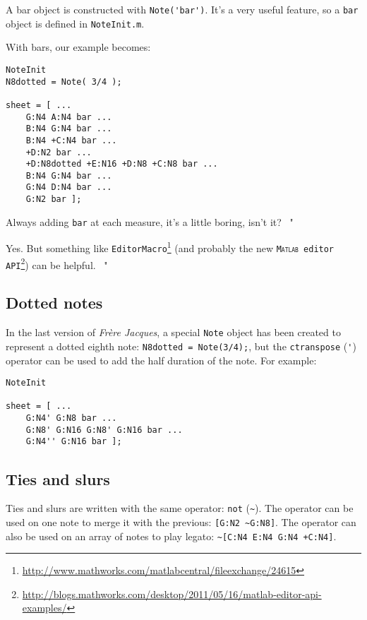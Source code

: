 \documentclass{article}
\newcommand\matlab{\textsc{Matlab}\xspace}
\newcommand\note{\lstinline!Note!\xspace}
\newcommand\frerejaques{\emph{Fr\`ere Jacques}\xspace}
\newcommand\noteInitFile{\texttt{NoteInit.m}\xspace}
\newcommand\exchange[2]{\texttt{#1}\footnote{\url{#2}}\xspace}
\newenvironment{meenv}{ \par \noindent \makebox[6em][r]{ \textcolor{mecolor}{Me}: " --~}}{~"}
\newenvironment{myselfenv}{ \par \noindent \makebox[6em][r]{ \textcolor{myselfcolor}{Myself}: " --~}}{~"}
\newcommand{ \me }[1]{%
\begin{meenv}%
	#1%
\end{meenv} }
\newcommand{ \myself }[1]{%
\begin{myselfenv}%
	#1%
\end{myselfenv} }
\begin{document}
A bar object is constructed with \lstinline!Note('bar')!. It's a very useful feature, so a \lstinline!bar! object is defined in \noteInitFile.

With bars, our example becomes:
\begin{lstlisting}
NoteInit
N8dotted = Note( 3/4 );

sheet = [ ...
	G:N4 A:N4 bar ...
	B:N4 G:N4 bar ...
	B:N4 +C:N4 bar ...
	+D:N2 bar ...
	+D:N8dotted +E:N16 +D:N8 +C:N8 bar ...
	B:N4 G:N4 bar ...
	G:N4 D:N4 bar ...
	G:N2 bar ];
\end{lstlisting}

\me{Always adding \lstinline!bar! at each measure, it's a little boring, isn't it?}
\myself{Yes. But something like \exchange{EditorMacro}{http://www.mathworks.com/matlabcentral/fileexchange/24615} (and probably the new \exchange{\matlab editor API}{http://blogs.mathworks.com/desktop/2011/05/16/matlab-editor-api-examples/}) can be helpful.}

\subsection{Dotted notes}
\label{sec:TutoDottedNotes}

In the last version of \frerejaques, a special \note object has been created to represent a dotted eighth note: \lstinline!N8dotted = Note(3/4);!, but the \lstinline!ctranspose! (\lstinline!'!) operator can be used to add the half duration of the note. For example: \\

\begin{lstlisting}
NoteInit

sheet = [ ...
	G:N4' G:N8 bar ...
	G:N8' G:N16 G:N8' G:N16 bar ...
	G:N4'' G:N16 bar ];
\end{lstlisting}

\subsection{Ties and slurs}

Ties and slurs are written with the same operator: \lstinline!not! (\lstinline!~!). The operator can be used on one note to merge it with the previous: \lstinline![G:N2 ~G:N8]!. The operator can also be used on an array of notes to play legato: \lstinline!~[C:N4 E:N4 G:N4 +C:N4]!.
\end{document}
